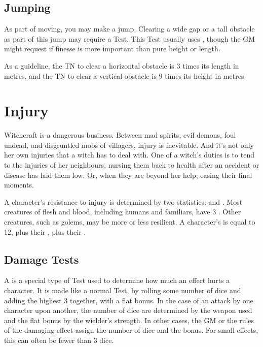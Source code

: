 \subsection{Jumping}

As part of moving, you may make a jump.
Clearing a wide gap or a tall obstacle as part of this jump may require a Test.
This Test usually uses , though the GM might request  if finesse is more important than pure height or length.

As a guideline, the TN to clear a horizontal obstacle is 3 times its length in metres, and the TN to clear a vertical obstacle is 9 times its height in metres.

\section{Injury}

Witchcraft is a dangerous business.
Between mad spirits, evil demons, foul undead, and disgruntled mobs of villagers, injury is inevitable.
And it's not only her own injuries that a witch has to deal with.
One of a witch's duties is to tend to the injuries of her neighbours, nursing them back to health after an accident or disease has laid them low.
Or, when they are beyond her help, easing their final moments.

A character's resistance to injury is determined by two statistics:  and .
Most creatures of flesh and blood, including humans and familiars, have $3$ .
Other creatures, such as golems, may be more or less resilient.
A character's  is equal to 12, plus their , plus their .

\subsection{Damage Tests}

A {\damagetest} is a special type of Test used to determine how much an effect hurts a character.
It is made like a normal Test, by rolling some number of dice and adding the highest 3 together, with a flat bonus.
In the case of an attack by one character upon another, the number of dice are determined by the weapon used and the flat bonus by the wielder's strength.
In other cases, the GM or the rules of the damaging effect assign the number of dice and the bonus.
For small effects, this can often be fewer than 3 dice.

